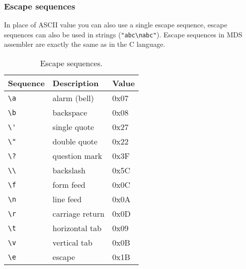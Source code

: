         \subsubsection{Escape sequences}
            In place of ASCII value you can also use a single escape sequence, escape sequences can also be used in strings (\verb'"abc\nabc"'). Escape sequences in MDS assembler are exactly the same as in the C language.

            \begin{table}[h!]
                \centering
                \begin{tabular}{|l|l|l|}
                    \hline
                    \textbf{Sequence} & \textbf{Description} & \textbf{Value} \\\hline
                    \verb'\a'         & alarm (bell)         & 0x07 \\\hline
                    \verb'\b'         & backspace            & 0x08 \\\hline
                    \verb"\'"         & single quote         & 0x27 \\\hline
                    \verb'\"'         & double quote         & 0x22 \\\hline
                    \verb'\?'         & question mark        & 0x3F \\\hline
                    \verb'\\'         & backslash            & 0x5C \\\hline
                    \verb'\f'         & form feed            & 0x0C \\\hline
                    \verb'\n'         & line feed            & 0x0A \\\hline
                    \verb'\r'         & carriage return      & 0x0D \\\hline
                    \verb'\t'         & horizontal tab       & 0x09 \\\hline
                    \verb'\v'         & vertical tab         & 0x0B \\\hline
                    \verb'\e'         & escape               & 0x1B \\\hline
                \end{tabular}
                \caption{Escape sequences.}
            \end{table}


